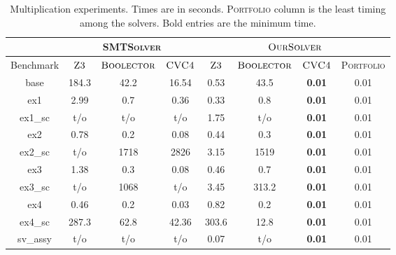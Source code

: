\begin{table}[t]
\centering
\caption{Multiplication experiments. Times are in seconds.
\textsc{Portfolio} column is the least timing among the solvers. Bold entries are the minimum time.}
\label{my-label}
\begin{tabular}{|c|c|c|c|c|c|c|c|}
\hline
                      & \multicolumn{3}{c|}{\textsc{SMTSolver}}                    & \multicolumn{4}{c|}{$\textsc{OurSolver}$}                              \\ \hline
Benchmark             & $\textsc{Z3}$ & $\textsc{Boolector}$ & $\textsc{CVC4}$ & $\textsc{Z3}$ & $\textsc{Boolector}$ & $\textsc{CVC4}$ & \textsc{Portfolio} \\ \hline
base                  & 184.3    & 42.2         & 16.54        & 0.53      & 43.5         & \textbf{0.01}       & 0.01                 \\ \hline
ex1                   & 2.99      & 0.7          & 0.36                     & 0.33      & 0.8          & \textbf{0.01}       & 0.01                 \\ \hline
ex1\_sc         & t/o       & t/o          & t/o                         & 1.75      & t/o          & \textbf{0.01}       & 0.01                 \\ \hline
ex2                   & 0.78      & 0.2          & 0.08                     & 0.44      & 0.3          & \textbf{0.01}       & 0.01                 \\ \hline
ex2\_sc         & t/o       & 1718       & 2826               & 3.15      & 1519       & \textbf{0.01}       & 0.01                 \\ \hline
ex3                   & 1.38      & 0.3          & 0.08                      & 0.46      & 0.7          & \textbf{0.01}       & 0.01                 \\ \hline
ex3\_sc         & t/o       & 1068       & t/o                     & 3.45      & 313.2        & \textbf{0.01}       & 0.01                 \\ \hline
ex4         & 0.46      & 0.2          & 0.03                      & 0.82      & 0.2          & \textbf{0.01}       & 0.01                 \\ \hline
ex4\_sc     & 287.3    & 62.8         & 42.36                  & 303.6    & 12.8         & \textbf{0.01}       & 0.01                 \\ \hline
sv\_assy              & t/o       & t/o          & t/o                        & 0.07      & t/o          & \textbf{0.01}       & 0.01                 \\ \hline

\end{tabular}
\end{table}

